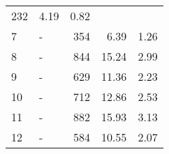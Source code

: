 \begin{longtable}{lXrrr}
       \num{232} &
       \num[round-mode=places,round-precision=2]{4,19} &
         \num[round-mode=places,round-precision=2]{0,82} \\

     7 &
     \multicolumn{1}{X}{ -  } &


       \num{354} &
       \num[round-mode=places,round-precision=2]{6,39} &
         \num[round-mode=places,round-precision=2]{1,26} \\

     8 &
     \multicolumn{1}{X}{ -  } &


       \num{844} &
       \num[round-mode=places,round-precision=2]{15,24} &
         \num[round-mode=places,round-precision=2]{2,99} \\

     9 &
     \multicolumn{1}{X}{ -  } &


       \num{629} &
       \num[round-mode=places,round-precision=2]{11,36} &
         \num[round-mode=places,round-precision=2]{2,23} \\

     10 &
     \multicolumn{1}{X}{ -  } &


       \num{712} &
       \num[round-mode=places,round-precision=2]{12,86} &
         \num[round-mode=places,round-precision=2]{2,53} \\

     11 &
     \multicolumn{1}{X}{ -  } &


       \num{882} &
       \num[round-mode=places,round-precision=2]{15,93} &
         \num[round-mode=places,round-precision=2]{3,13} \\

     12 &
     \multicolumn{1}{X}{ -  } &


       \num{584} &
       \num[round-mode=places,round-precision=2]{10,55} &
         \num[round-mode=places,round-precision=2]{2,07} \\


\end{longtable}
